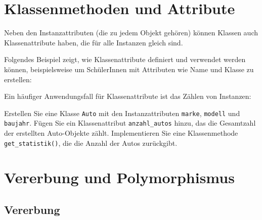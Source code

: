 \section{Klassenmethoden und Attribute}

Neben den Instanzattributen (die zu jedem Objekt gehören) können Klassen auch Klassenattribute haben, die für alle Instanzen gleich sind.

\begin{myexample}[Klassenattribute] Folgendes Beispiel zeigt, wie Klassenattribute definiert und verwendet werden können, beispielsweise um SchülerInnen mit Attributen wie Name und Klasse zu erstellen:

\end{myexample}

\begin{myexample}[Instanzzähler]
Ein häufiger Anwendungsfall für Klassenattribute ist das Zählen von Instanzen:


\end{myexample}

\begin{myexercise}
	Erstellen Sie eine Klasse \lstinline|Auto| mit den Instanzattributen \lstinline|marke|, \lstinline|modell| und \lstinline|baujahr|. Fügen Sie ein Klassenattribut \lstinline|anzahl_autos| hinzu, das die Gesamtzahl der erstellten Auto-Objekte zählt. Implementieren Sie eine Klassenmethode \lstinline|get_statistik()|, die die Anzahl der Autos zurückgibt.

	\begin{myanswer}
		\leavevmode
		
	\end{myanswer}
\end{myexercise}

\section{Vererbung und Polymorphismus}
\subsection{Vererbung}

